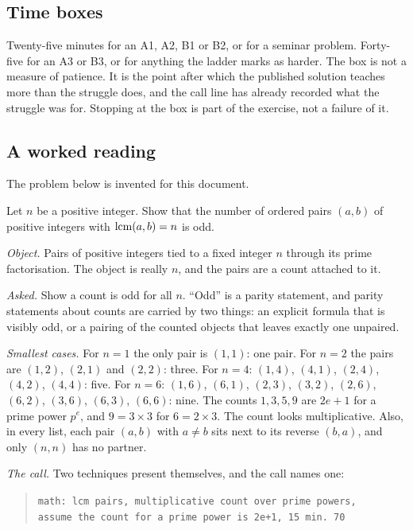 \subsection*{Time boxes}

Twenty-five minutes for an A1, A2, B1 or B2, or for a seminar problem. Forty-five for an A3 or B3, or for anything the ladder marks as harder. The box is not a measure of patience. It is the point after which the published solution teaches more than the struggle does, and the call line has already recorded what the struggle was for. Stopping at the box is part of the exercise, not a failure of it.

\subsection*{A worked reading}

The problem below is invented for this document.

\begin{example}
Let $n$ be a positive integer. Show that the number of ordered pairs $(a, b)$ of positive integers with $\operatorname{lcm}(a, b) = n$ is odd.
\end{example}

\emph{Object.} Pairs of positive integers tied to a fixed integer $n$ through its prime factorisation. The object is really $n$, and the pairs are a count attached to it.

\emph{Asked.} Show a count is odd for all $n$. ``Odd'' is a parity statement, and parity statements about counts are carried by two things: an explicit formula that is visibly odd, or a pairing of the counted objects that leaves exactly one unpaired.

\emph{Smallest cases.} For $n = 1$ the only pair is $(1, 1)$: one pair. For $n = 2$ the pairs are $(1, 2)$, $(2, 1)$ and $(2, 2)$: three. For $n = 4$: $(1, 4)$, $(4, 1)$, $(2, 4)$, $(4, 2)$, $(4, 4)$: five. For $n = 6$: $(1, 6)$, $(6, 1)$, $(2, 3)$, $(3, 2)$, $(2, 6)$, $(6, 2)$, $(3, 6)$, $(6, 3)$, $(6, 6)$: nine. The counts $1, 3, 5, 9$ are $2e + 1$ for a prime power $p^e$, and $9 = 3 \times 3$ for $6 = 2 \times 3$. The count looks multiplicative. Also, in every list, each pair $(a, b)$ with $a \ne b$ sits next to its reverse $(b, a)$, and only $(n, n)$ has no partner.

\emph{The call.} Two techniques present themselves, and the call names one:

\begin{quote}\small
\texttt{math: lcm pairs, multiplicative count over prime powers,}\\
\texttt{\phantom{math: }assume the count for a prime power is 2e+1, 15 min. 70}
\end{quote}

